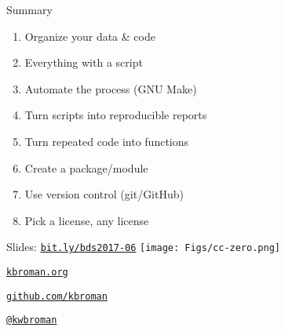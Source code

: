 \documentclass[12pt,t]{beamer}
\begin{document}
\begin{frame}[c]{Summary}

  \begin{enumerate}
  \itemsep12pt
  \item Organize your data \& code
  \item Everything with a script
  \item Automate the process (GNU Make)
  \item Turn scripts into reproducible reports
  \item Turn repeated code into functions
  \item Create a package/module
  \item Use version control (git/GitHub)
  \item Pick a license, any license
  \end{enumerate}

\end{frame}

\begin{frame}[c]{}

\Large

Slides: \href{http://bit.ly/bds2017-06}{\tt bit.ly/bds2017-06} \quad
\texttt{[image: Figs/cc-zero.png]}

\vspace{10mm}

\href{http://kbroman.org}{\tt kbroman.org}

\vspace{10mm}

\href{https://github.com/kbroman}{\tt github.com/kbroman}

\vspace{10mm}

\href{https://twitter.com/kwbroman}{\tt @kwbroman}


\end{frame}
\end{document}
